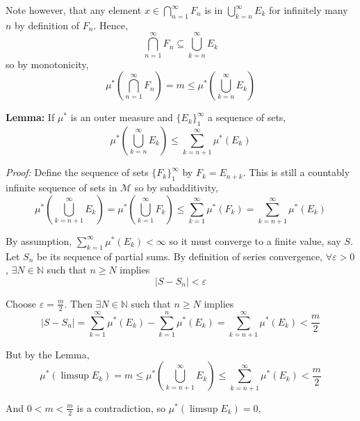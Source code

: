 \documentclass[12pt]{article}
\newcommand{\N}{\mathbb{N}}
\newcommand{\abs}[1]{\left\vert #1 \right\vert}
\newcommand{\ep}{\varepsilon}
\newcommand{\sub}{\subseteq}
\newcommand{\M}{\mathcal{M}}
\newenvironment*{proof}[1][blue]{
        \begin{tcolorbox}[
            parbox=false,
            colback=#1!5!white,
            colframe=#1!75!black,
            coltext=#1,
            breakable
        ]}
        {\end{tcolorbox}}
\begin{document}
        Note however, that any element $x \in \bigcap_{n=1}^{\infty} F_n$ is in $\bigcup_{k=n}^{\infty} E_k$ for infinitely many $n$ by definition of $F_n$. Hence, 
        \[\bigcap_{n=1}^{\infty} F_n \sub \bigcup_{k=n}^{\infty} E_k\]
        so by monotonicity, 
        \[\mu^* \left(\bigcap_{n=1}^{\infty} F_n\right) = m \leq \mu^*\left(\bigcup_{k=n}^{\infty} E_k\right)\]

        \textbf{Lemma:} If $\mu^*$ is an outer measure and $\{E_k\}_1^{\infty}$ a sequence of sets, 
        \[\mu^*(\bigcup_{k=n}^{\infty} E_k) \leq \sum_{k=n+1}^{\infty} \mu^*(E_k)\]

        \begin{proof}
            \emph{Proof:} Define the sequence of sets $\{F_k\}_1^{\infty}$ by $F_k = E_{n+k}$. This is still a countably infinite sequence of sets in $\M$ so by subadditivity,
            \[\mu^*\left(\bigcup_{k=n+1}^\infty E_k\right) = \mu^*\left(\bigcup_{k=1}^\infty F_k\right) \leq \sum_{k=1}^{\infty} \mu^*(F_k) = \sum_{k=n+1}^{\infty} \mu^*(E_k)\]
        \end{proof}

        By assumption, $\sum_{k=1}^{\infty} \mu^*(E_k) < \infty$ so it must converge to a finite value, say $S$. Let $S_n$ be its sequence of partial sums. By definition of series convergence, $\forall \ep > 0$, $\exists N \in \N$ such that $n \geq N$ implies 
        \[\abs{S - S_n} < \ep\]

        Choose $\ep = \frac{m}{2}$. Then $\exists N \in \N$ such that $n \geq N$ implies
        \[\abs{S - S_n} = \sum_{k=1}^{\infty} \mu^*(E_k) - \sum_{k=1}^n \mu^*(E_k) = \sum_{k={n+1}}^{\infty} \mu^*(E_k) < \frac{m}{2}\]

        But by the Lemma, 
        \[\mu^*(\limsup E_k) = m \leq \mu^*\left(\bigcup_{k=n+1}^{\infty} E_k\right) \leq \sum_{k={n+1}}^{\infty} \mu^*(E_k) < \frac{m}{2}\]  
        
        And $0 < m < \frac{m}{2}$ is a contradiction, so $\mu^*(\limsup E_k) = 0$,


    \color{black}
\end{document}
